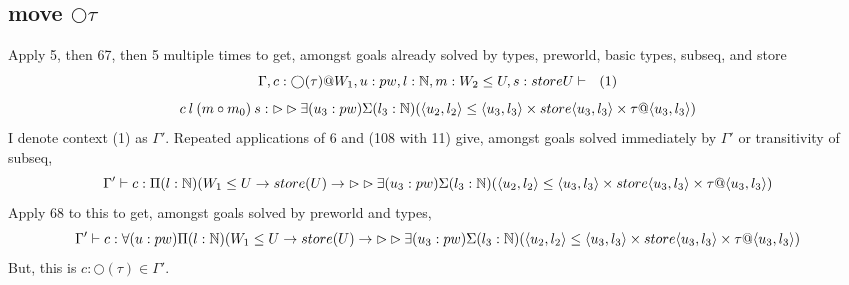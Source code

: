 \documentclass{article}
\begin{document}
\subsection*{move $\bigcirc \tau$}
Apply 5, then 67, then 5 multiple times to get, amongst goals already solved by types, preworld, basic types, subseq, and store
\[\Gamma, c: \bigcirc(\tau) @ W_1, u: pw, l: \mathbb{N}, m: W_2 \leq U, s: store U \vdash \:\:\: (1)\] \[ c \: l \: (m \circ m
    _0) \: s: \rhd \rhd \exists(u_3: pw)\Sigma(l_3: \mathbb{N})(\langle u_2, l_2 \rangle \leq \langle u_3, l_3 \rangle \times store\langle u_3, l_3 \rangle \times \tau @\langle u_3, l_3 \rangle)\]
    I denote context (1) as $\Gamma'$.
    Repeated applications of 6 and (108 with 11) give, amongst goals solved immediately by $\Gamma'$ or transitivity of subseq,
  \[\Gamma' \vdash c: \Pi(l: \mathbb{N})(W_1 \leq U \rightarrow store(U) \rightarrow  \rhd \rhd \exists(u_3: pw)\Sigma(l_3: \mathbb{N})(\langle u_2, l_2 \rangle \leq \langle u_3, l_3 \rangle \times store\langle u_3, l_3 \rangle \times \tau @\langle u_3, l_3 \rangle)\]
Apply 68 to this to get, amongst goals solved by preworld and types,
  \[\Gamma' \vdash c: \forall(u: pw)\Pi(l: \mathbb{N})(W_1 \leq U \rightarrow store(U) \rightarrow  \rhd \rhd \exists(u_3: pw)\Sigma(l_3: \mathbb{N})(\langle u_2, l_2 \rangle \leq \langle u_3, l_3 \rangle \times store\langle u_3, l_3 \rangle \times \tau @\langle u_3, l_3 \rangle)\]
  But, this is $c : \bigcirc(\tau) \in \Gamma'$.
  
\end{document}
